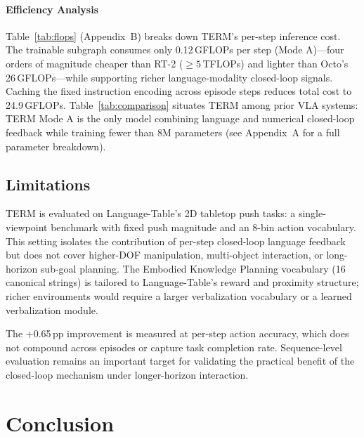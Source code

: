 \documentclass[letterpaper]{article} %
\begin{document}
\paragraph{Efficiency Analysis} Table~\ref{tab:flops} (Appendix~B) breaks down TERM's per-step inference cost. The trainable subgraph consumes only 0.12\,GFLOPs per step (Mode A)---four orders of magnitude cheaper than RT-2 (${\ge}5$\,TFLOPs) and lighter than Octo's 26\,GFLOPs---while supporting richer language-modality closed-loop signals. Caching the fixed instruction encoding across episode steps reduces total cost to 24.9\,GFLOPs. Table~\ref{tab:comparison} situates TERM among prior VLA systems: TERM Mode A is the only model combining language and numerical closed-loop feedback while training fewer than 8M parameters (see Appendix~A for a full parameter breakdown).


\subsection{Limitations}

TERM is evaluated on Language-Table's 2D tabletop push tasks: a single-viewpoint benchmark with fixed push magnitude and an 8-bin action vocabulary. This setting isolates the contribution of per-step closed-loop language feedback but does not cover higher-DOF manipulation, multi-object interaction, or long-horizon sub-goal planning. The Embodied Knowledge Planning vocabulary (16 canonical strings) is tailored to Language-Table's reward and proximity structure; richer environments would require a larger verbalization vocabulary or a learned verbalization module.

The +0.65\,pp improvement is measured at per-step action accuracy, which does not compound across episodes or capture task completion rate. Sequence-level evaluation remains an important target for validating the practical benefit of the closed-loop mechanism under longer-horizon interaction.

\section{Conclusion}
\end{document}
